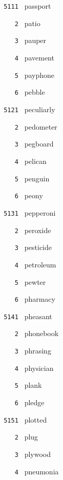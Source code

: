 \documentclass[11pt]{article}
\begin{document}
\begin{multicols}{6}
\footnotesize
\noindent \texttt{ 5111 } passport  \par
\noindent \texttt{ \ \ \ 2 } patio  \par
\noindent \texttt{ \ \ \ 3 } pauper  \par
\noindent \texttt{ \ \ \ 4 } pavement  \par
\noindent \texttt{ \ \ \ 5 } payphone  \par
\noindent \texttt{ \ \ \ 6 } pebble  \par
\vspace{3mm}
\noindent \texttt{ 5121 } peculiarly  \par
\noindent \texttt{ \ \ \ 2 } pedometer  \par
\noindent \texttt{ \ \ \ 3 } pegboard  \par
\noindent \texttt{ \ \ \ 4 } pelican  \par
\noindent \texttt{ \ \ \ 5 } penguin  \par
\noindent \texttt{ \ \ \ 6 } peony  \par
\vspace{3mm}
\noindent \texttt{ 5131 } pepperoni  \par
\noindent \texttt{ \ \ \ 2 } peroxide  \par
\noindent \texttt{ \ \ \ 3 } pesticide  \par
\noindent \texttt{ \ \ \ 4 } petroleum  \par
\noindent \texttt{ \ \ \ 5 } pewter  \par
\noindent \texttt{ \ \ \ 6 } pharmacy  \par
\vspace{3mm}
\noindent \texttt{ 5141 } pheasant  \par
\noindent \texttt{ \ \ \ 2 } phonebook  \par
\noindent \texttt{ \ \ \ 3 } phrasing  \par
\noindent \texttt{ \ \ \ 4 } physician  \par
\noindent \texttt{ \ \ \ 5 } plank  \par
\noindent \texttt{ \ \ \ 6 } pledge  \par
\vspace{3mm}
\noindent \texttt{ 5151 } plotted  \par
\noindent \texttt{ \ \ \ 2 } plug  \par
\noindent \texttt{ \ \ \ 3 } plywood  \par
\noindent \texttt{ \ \ \ 4 } pneumonia  \par

\end{multicols}
\end{document}
